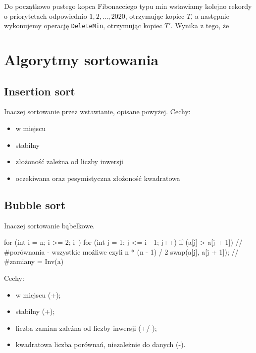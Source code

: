 \begin{problems}
    \prob Do początkowo pustego kopca Fibonacciego typu min wstawiamy kolejno rekordy o priorytetach odpowiednio $1, 2, ..., 2020$, otrzymując kopiec $T$, a następnie wykonujemy operację \texttt{DeleteMin}, otrzymując kopiec $T'$. Wynika z tego, że
\end{problems}


\section{Algorytmy sortowania}
\subsection{Insertion sort}
Inaczej sortowanie przez wstawianie, opisane powyżej. Cechy:
\begin{itemize}
    \item w miejscu
    \item stabilny
    \item złożoność zależna od liczby inwersji
    \item oczekiwana oraz pesymistyczna złożoność kwadratowa
\end{itemize}

\subsection{Bubble sort}
Inaczej sortowanie bąbelkowe.
\begin{cpp}
    for (int i = n; i >= 2; i--) {
        for (int j = 1; j <= i - 1; j++) {
            if (a[j] > a[j + 1])       // #porównania - wszystkie możliwe czyli n * (n - 1) / 2
                swap(a[j], a[j + 1]);  // #zamiany = Inv(a)
        }
    }
\end{cpp}
Cechy:
\begin{itemize}
    \item w miejscu (+);
    \item stabilny (+);
    \item liczba zamian zależna od liczby inwersji (+/-);
    \item kwadratowa liczba porównań, niezależnie do danych (-).
\end{itemize}

